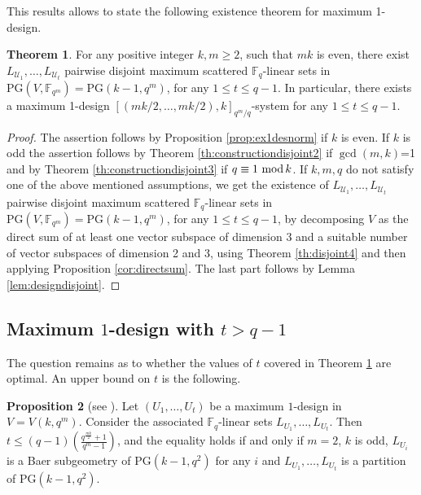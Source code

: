\documentclass[11pt]{amsart}
\theoremstyle{definition}
\newtheorem{theorem}{Theorem}[section]
\newtheorem{proposition}[theorem]{Proposition}
\newcommand{\F}{{\mathbb F}}
\newcommand{\U}{{\mathcal{U}}}
\newcommand{\fq}{{\mathbb F}_{q}}
\renewcommand{\mod}{\hbox{{\rm mod}\,}}
\newcommand{\PG}{\mathrm{PG}}
\begin{document}
{This results allows to state the following existence theorem for maximum 1-design.
\begin{theorem} \label{th:existence1design}
    For any positive integer $k,m \geq 2$, such that $mk$ is even, there exist $L_{\U_1},\ldots,L_{\U_t}$ pairwise disjoint maximum scattered $\F_q$-linear sets in $\PG(V,\F_{q^m})=\PG(k-1,q^m)$, for any $1 \leq t \leq q-1$. In particular, there exists a maximum 1-design $[(mk/2,\ldots,mk/2),k]_{q^m/q}$-system for any $1 \leq t \leq q-1$.
\end{theorem}

\begin{proof}
    The assertion follows by Proposition \ref{prop:ex1desnorm} if $k$ is even. If $k$ is odd the assertion follows by Theorem \ref{th:constructiondisjoint2} if $\gcd(m,k)$=1 and by Theorem \ref{th:constructiondisjoint3} if $q \equiv 1 \ \mod k$.
    If $k,m,q$ do not satisfy one of the above mentioned assumptions, we get the existence of $L_{\U_1},\ldots,L_{\U_t}$ pairwise disjoint maximum scattered $\F_q$-linear sets in $\PG(V,\F_{q^m})=\PG(k-1,q^m)$, for any $1 \leq t \leq q-1$, by decomposing $V$ as the direct sum of at least one vector subspace of dimension 3 and a suitable number of vector subspaces of dimension 2 and 3, using Theorem \ref{th:disjoint4} and then applying Proposition \ref{cor:directsum}. The last part follows by Lemma \ref{lem:designdisjoint}.
\end{proof}

\subsection{Maximum \texorpdfstring{$1$}{Lg}-design with $t>q-1$} \label{subsec:maximum1designt>q-1}
The question remains as to whether the values of $t$ covered in Theorem \ref{th:existence1design} are optimal. An upper bound on $t$ is the following.
\begin{proposition} [see \textnormal{\cite[Corollary 5.22]{santonastaso2022subspace}}]
Let $(U_1,\ldots,U_t)$ be a maximum $1$-design in $V=V(k,q^m)$.
Consider the associated $\fq$-linear sets $L_{U_1},\ldots,L_{U_t}$. Then 
    $t \leq (q-1)\left(\frac{q^{\frac{mk}{2}}+1}{q^m-1}\right)$,
and the equality holds if and only if $m=2$, $k$ is odd, $L_{U_i}$ is a Baer subgeometry of $\PG(k-1,q^2)$ for any $i$ and $L_{U_1},\ldots,L_{U_t}$ is a partition of $\PG(k-1,q^2)$.
\end{proposition}

}
\end{document}
